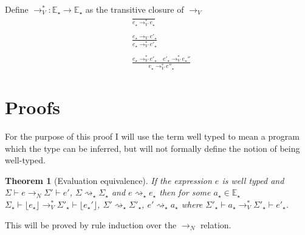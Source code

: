 \documentclass[float=false, crop=false]{standalone}
\newtheorem{theorem}{Theorem}
\numberwithin{subcase}{case}
\newcommand{\tlang}{\star}
\newcommand{\unwrap}[1]{\lfloor #1 \rfloor}
\newcommand{\tcbn}{\rightarrow_N}
\newcommand{\tcbv}{\rightarrow_V}
\newcommand{\tccbv}{\rightarrow_V^*}
\newcommand{\tlthunk}{\rightsquigarrow_\tlang}
\begin{document}
Define $\tccbv: \mathbb{E}_\tlang \rightarrow \mathbb{E}_\tlang$ as the transitive closure of $\tcbv$
\begin{align*}
  &\frac{}{e_\tlang \tccbv e_\tlang} \\ \\
  &\frac{e_\tlang \tcbv e'_\tlang}{e_\tlang \tccbv e'_\tlang} \\ \\
  &\frac{e_\tlang \tccbv e'_\tlang \quad e'_\tlang \tccbv e_\tlang'' }{e_\tlang \tccbv e''_\tlang}
\end{align*}

\section{Proofs}

For the purpose of this proof I will use the term well typed to mean a program which the 
type can be inferred, but will not formally define the notion of being well-typed.

\begin{theorem}[Evaluation equivalence]
If the expression $e$ is well typed and
\mbox{$\Sigma \vdash e \tcbn \Sigma' \vdash e'$}, $\Sigma \tlthunk \Sigma_\tlang$ and \mbox{$e \tlthunk e_\tlang$} 
then for some $a_\tlang \in \mathbb{E}_\tlang$ 
\mbox{$\Sigma_\tlang \vdash \unwrap{e_\tlang}\tccbv \Sigma'_\tlang \vdash \unwrap{e_\tlang'}$},
\mbox{$\Sigma' \tlthunk \Sigma'_\tlang$}, \mbox{$e' \tlthunk a_\tlang$} where 
\mbox{$\Sigma'_\tlang \vdash a_\tlang \tccbv \Sigma'_\tlang \vdash  e'_\tlang$}.
\end{theorem}



This will be proved by rule induction over the $\tcbn$ relation. 
\end{document}
